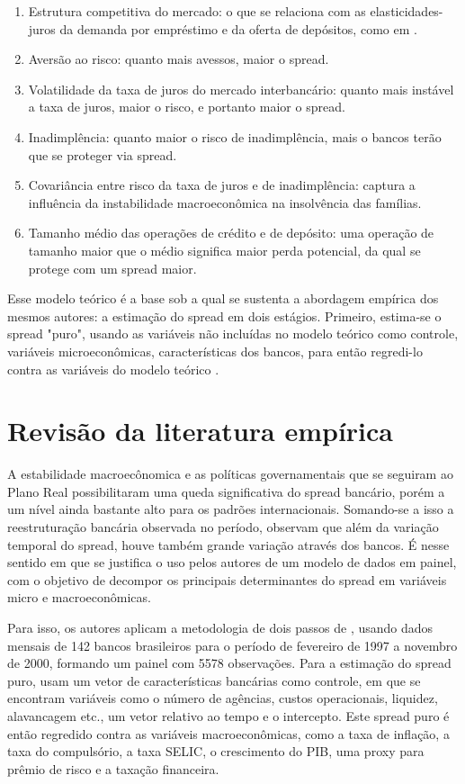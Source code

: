 \documentclass[a4paper, 12pt, openany, oneside, brazil]{abntex2}
\begin{document}
	\begin{enumerate}
		\item Estrutura competitiva do mercado: o que se relaciona com as elasticidades-juros da demanda por empréstimo e da oferta de depósitos, como em .
		\item Aversão ao risco: quanto mais avessos, maior o spread.
		\item Volatilidade da taxa de juros do mercado interbancário: quanto mais instável a taxa de juros, maior o risco, e portanto maior o spread.
		\item Inadimplência: quanto maior o risco de inadimplência, mais o bancos terão que se proteger via spread.
		\item Covariância entre risco da taxa de juros e de inadimplência: captura a influência da instabilidade macroeconômica na insolvência das famílias. \cite{oreiro}
		\item Tamanho médio das operações de crédito e de depósito: uma operação de tamanho maior que o médio significa maior perda potencial, da qual se protege com um spread maior.
	\end{enumerate}

    Esse modelo teórico é a base sob a qual se sustenta a abordagem empírica
    dos mesmos autores: a estimação do spread em dois estágios. Primeiro,
    estima-se o spread "puro", usando as variáveis não incluídas no modelo
    teórico como controle, variáveis microeconômicas, características dos
    bancos, para então regredi-lo contra as variáveis do modelo teórico
    .

\section{Revisão da literatura empírica}

    A estabilidade macroecônomica e as políticas governamentais que se seguiram
    ao Plano Real possibilitaram uma queda significativa do spread bancário,
    porém a um nível ainda bastante alto para os padrões internacionais.
    Somando-se a isso a reestruturação bancária observada no período,
     observam que além da variação temporal do spread,
    houve também grande variação através dos bancos. É nesse sentido em que se
    justifica o uso pelos autores de um modelo de dados em painel, com o
    objetivo de decompor os principais determinantes do spread em variáveis
    micro e macroeconômicas.

    Para isso, os autores aplicam a metodologia de dois passos de
    , usando dados mensais de 142 bancos brasileiros
    para o período de fevereiro de 1997 a novembro de 2000, formando um painel
    com 5578 observações. Para a estimação do spread puro, usam um vetor de
    características bancárias como controle, em que se encontram variáveis como
    o número de agências, custos operacionais, liquidez, alavancagem etc., um
    vetor relativo ao tempo e o intercepto. Este spread puro é então regredido
    contra as variáveis macroeconômicas, como a taxa de inflação, a taxa do
    compulsório, a taxa SELIC, o crescimento do PIB, uma proxy para prêmio de
    risco e a taxação financeira.
  
\end{document}
